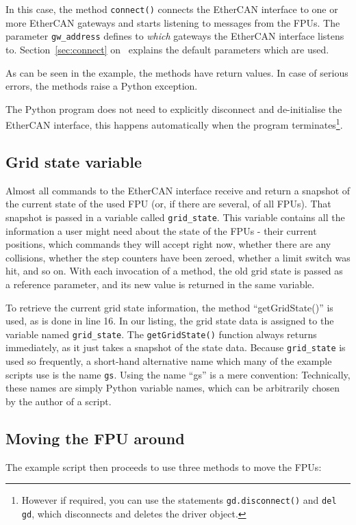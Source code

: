 \documentclass[11pt,a4paper]{report}
\begin{document}
In this case, the method \texttt{connect()} connects the EtherCAN interface to one
or more EtherCAN gateways and starts listening to messages from the
FPUs. The parameter \texttt{gw\_address} defines to \emph{which}
gateways the EtherCAN interface listens to. Section~\ref{sec:connect}
on~\pageref{sec:connect} explains the default parameters which are
used.

As can be seen in the example, the methods have return values.  In
case of serious errors, the methods raise a Python exception.

The Python program does not need to explicitly disconnect and
de-initialise the EtherCAN interface, this happens automatically when the program
terminates\footnote{However if required, you can use the statements
  \texttt{gd.disconnect()} and \texttt{del gd}, which disconnects and
  deletes the driver object.}.



\subsection{Grid state variable}
 Almost all commands to the EtherCAN interface
receive and return a snapshot of the current state of the used FPU
(or, if there are several, of all FPUs). That snapshot is passed in a
variable called \texttt{grid\_state}. This variable contains all the
information a user might need about the state of the FPUs - their
current positions, which commands they will accept right now, whether
there are any collisions, whether the step counters have been zeroed,
whether a limit switch was hit, and so on. With each invocation of a
method, the old grid state is passed as a reference parameter, and its
new value is returned in the same variable.

To retrieve the current grid state information, the method
``getGridState()'' is used, as is done in line 16. In our listing, the
grid state data is assigned to the variable named
\texttt{grid\_state}.  The \texttt{getGridState()} function always
returns immediately, as it just takes a snapshot of the state
data. Because \texttt{grid\_state} is used so frequently, a short-hand
alternative name which many of the example scripts use is the name
\texttt{gs}.  Using the name ``gs'' is a mere convention: Technically,
these names are simply Python variable names, which can be arbitrarily
chosen by the author of a script.

\subsection{Moving the FPU around}
The example script then proceeds to use three methods to move
the FPUs:
\end{document}
